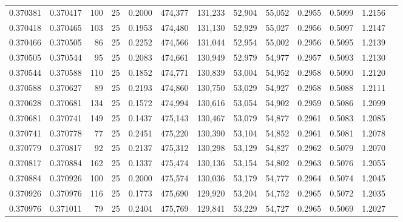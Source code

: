 \begin{tabular}{rrrrrrrrrrrrr}
0.370381 & 0.370417 &   100 &  25 &                                     0.2000 & 474,377 & 131,233 &  52,904 &  55,052 & 0.2955 & 0.5099 & 1.2156 \\
0.370418 & 0.370465 &   103 &  25 &                                     0.1953 & 474,480 & 131,130 &  52,929 &  55,027 & 0.2956 & 0.5097 & 1.2147 \\
0.370466 & 0.370505 &    86 &  25 &                                     0.2252 & 474,566 & 131,044 &  52,954 &  55,002 & 0.2956 & 0.5095 & 1.2139 \\
0.370505 & 0.370544 &    95 &  25 &                                     0.2083 & 474,661 & 130,949 &  52,979 &  54,977 & 0.2957 & 0.5093 & 1.2130 \\
0.370544 & 0.370588 &   110 &  25 &                                     0.1852 & 474,771 & 130,839 &  53,004 &  54,952 & 0.2958 & 0.5090 & 1.2120 \\
0.370588 & 0.370627 &    89 &  25 &                                     0.2193 & 474,860 & 130,750 &  53,029 &  54,927 & 0.2958 & 0.5088 & 1.2111 \\
0.370628 & 0.370681 &   134 &  25 &                                     0.1572 & 474,994 & 130,616 &  53,054 &  54,902 & 0.2959 & 0.5086 & 1.2099 \\
0.370681 & 0.370741 &   149 &  25 &                                     0.1437 & 475,143 & 130,467 &  53,079 &  54,877 & 0.2961 & 0.5083 & 1.2085 \\
0.370741 & 0.370778 &    77 &  25 &                                     0.2451 & 475,220 & 130,390 &  53,104 &  54,852 & 0.2961 & 0.5081 & 1.2078 \\
0.370779 & 0.370817 &    92 &  25 &                                     0.2137 & 475,312 & 130,298 &  53,129 &  54,827 & 0.2962 & 0.5079 & 1.2070 \\
0.370817 & 0.370884 &   162 &  25 &                                     0.1337 & 475,474 & 130,136 &  53,154 &  54,802 & 0.2963 & 0.5076 & 1.2055 \\
0.370884 & 0.370926 &   100 &  25 &                                     0.2000 & 475,574 & 130,036 &  53,179 &  54,777 & 0.2964 & 0.5074 & 1.2045 \\
0.370926 & 0.370976 &   116 &  25 &                                     0.1773 & 475,690 & 129,920 &  53,204 &  54,752 & 0.2965 & 0.5072 & 1.2035 \\
0.370976 & 0.371011 &    79 &  25 &                                     0.2404 & 475,769 & 129,841 &  53,229 &  54,727 & 0.2965 & 0.5069 & 1.2027 \\

\end{tabular}
